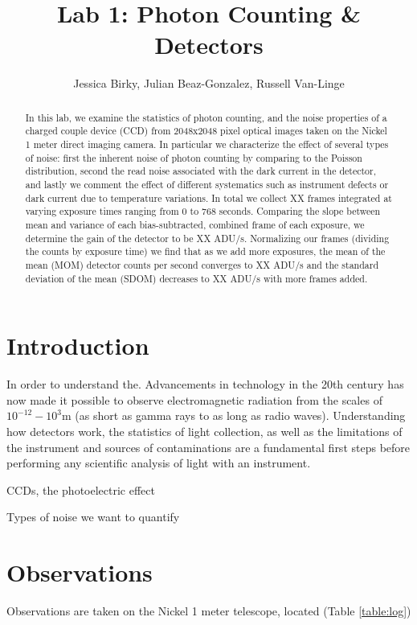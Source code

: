 \documentclass[preprint]{aastex62}
\begin{document}
\title{\sc Lab 1: Photon Counting \& Detectors}
\author{Jessica Birky, Julian Beaz-Gonzalez, Russell Van-Linge}


\begin{abstract}
In this lab, we examine the statistics of photon counting, and the noise properties of a charged couple device (CCD) from 2048x2048 pixel optical images taken on the Nickel 1 meter direct imaging camera. In particular we characterize the effect of several types of noise: first the inherent noise of photon counting by comparing to the Poisson distribution, second the read noise associated with the dark current in the detector, and lastly we comment the effect of different systematics such as instrument defects or dark current due to temperature variations. In total we collect XX frames integrated at varying exposure times ranging from 0 to 768 seconds. Comparing the slope between mean and variance of each bias-subtracted, combined frame of each exposure, we determine the gain of the detector to be XX ADU/s. Normalizing our frames (dividing the counts by exposure time) we find that as we add more exposures, the mean of the mean (MOM) detector counts per second converges to XX ADU/s and the standard deviation of the mean (SDOM) decreases to XX ADU/s with more frames added.

\end{abstract}
\bigskip

\section{Introduction} 
In order to understand the. Advancements in technology in the 20th century has now made it possible to observe electromagnetic radiation from the scales of $10^{-12}-10^3$m (as short as gamma rays to as long as radio waves). Understanding how detectors work, the statistics of light collection, as well as the limitations of the instrument and sources of contaminations are a fundamental first steps before performing any scientific analysis of light with an instrument.

CCDs, the photoelectric effect

Types of noise we want to quantify

\section{Observations}
Observations are taken on the Nickel 1 meter telescope, located  (Table \ref{table:log})
\end{document}
